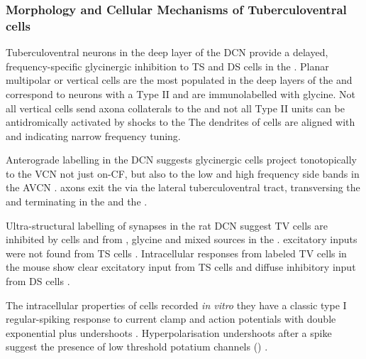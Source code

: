 

\subsubsection{Morphology and Cellular Mechanisms of Tuberculoventral cells}

Tuberculoventral neurons in the deep layer of the DCN provide a delayed,
frequency-specific glycinergic inhibition to TS and DS cells in the \VCN
\citep{ZhangOertel:1993,WickesbergOertel:1988}.  Planar multipolar or vertical
cells are the most populated in the deep layers of the \DCN and correspond to
neurons with a Type II \EIRA \citep{SpirouDavisEtAl:1999,Rhode:1999} and are
immunolabelled with glycine.  Not all vertical cells send axona collaterals to
the \VCN \citep{Rhode:1999} and not all Type II units can be antidromically
activated by shocks to the \VCN The dendrites of \TV cells are aligned with
\ANFs and indicating narrow frequency tuning.


Anterograde labelling in the DCN suggests glycinergic \TV cells
project tonotopically to the VCN not just on-CF, but also to the low
and high frequency side bands in the AVCN
\citep{WickesbergOertel:1993,WickesbergOertel:1988,WickesbergWhitlonEtAl:1991,Wickesberg:1996,OstapoffFengEtAl:1994,MunirathinamOstapoffEtAl:2004}.
\TV axons exit the \DCN via the lateral tuberculoventral tract, transversing the
\GCD and terminating in the \PVCN and the \AVCN.


Ultra-structural labelling of synapses in the rat DCN suggest TV cells
are inhibited by \DS cells and from \GABA, glycine and mixed sources
in the \DCN \citep{RubioJuiz:2004}.  excitatory inputs were not found
from TS cells \citep{RubioJuiz:2004}.  Intracellular responses from
labeled TV cells in the mouse show clear excitatory input from TS
cells and diffuse inhibitory input from DS cells
\citep{ZhangOertel:1993}.



The intracellular properties of \TV cells recorded \textit{in vitro}
they have a classic type I regular-spiking response to current clamp
and action potentials with double exponential plus undershoots
\citep{EvansNelson:1973,WickesbergOertel:1990,YoungBrownell:1976,YoungVoigt:1981,ZhangOertel:1993}.
Hyperpolarisation undershoots after a spike suggest the presence of
low threshold potatium channels
(\IKLT) \citep{ManisMarx:1991,RothmanManis:2003}.



